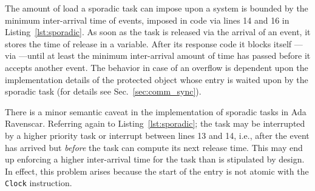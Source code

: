 The amount of load a sporadic task can impose upon a system is bounded
by the minimum inter-arrival time of events, imposed in code via lines
14 and 16 in Listing~\ref{lst:sporadic}. As soon as the task is
released via the arrival of an event, it stores the time of release in
a variable. After its response code it blocks itself ---via ---until at least the minimum inter-arrival amount of time has
passed before it accepts another event. The behavior in case of an
overflow is dependent upon the implementation details of the protected
object whose entry is waited upon by the sporadic task (for details
see Sec.~\ref{sec:comm_sync}).

There is a minor semantic caveat in the implementation of sporadic
tasks in Ada Ravenscar. Referring again to Listing~\ref{lst:sporadic};
the task may be interrupted by a higher priority task or interrupt
between lines 13 and 14, i.e., after the event has arrived but
\emph{before} the task can compute its next release time. This may end
up enforcing a higher inter-arrival time for the task than is
stipulated by design. In effect, this problem arises because the start
of the entry is not atomic with the \texttt{Clock} instruction.

